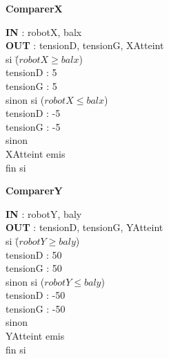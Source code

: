 \begin{description}
	
	\item \textbf{ComparerX}
		\begin{tabbing} 
		\textbf{IN} : robotX, balx \\
		\textbf{OUT} : tensionD, tensionG, XAtteint \\
		si \=($robotX \ge balx$) \\
			\>tensionD : 5 \\
			\>tensionG : 5 \\
		sinon si ($robotX \le balx$) \\ 
			\>tensionD : -5 \\
			\>tensionG : -5 \\
		sinon \\
			\>XAtteint emis \\
		fin si 
		\end{tabbing}

	\item \textbf{ComparerY}
		\begin{tabbing} 
		\textbf{IN} : robotY, baly \\
		\textbf{OUT} : tensionD, tensionG, YAtteint \\
		si \=($robotY \ge baly$) \\
			\>tensionD : 50 \\
			\>tensionG : 50 \\
		sinon si ($robotY \le baly$) \\
			\>tensionD : -50 \\
			\>tensionG : -50 \\
		sinon \\
			\>YAtteint emis \\
		fin si 
		\end{tabbing}


\end{description}

\vfill
\pagebreak

